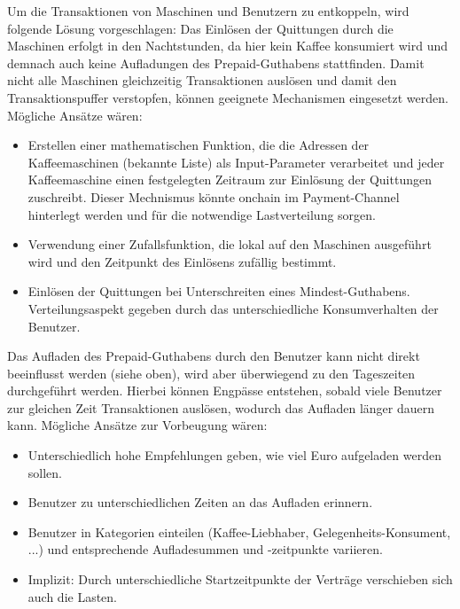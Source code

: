 Um die Transaktionen von Maschinen und Benutzern zu entkoppeln, wird folgende Lösung vorgeschlagen: Das Einlösen der Quittungen durch die Maschinen erfolgt in den Nachtstunden, da hier kein Kaffee konsumiert wird und demnach auch keine Aufladungen des Prepaid-Guthabens stattfinden. Damit nicht alle Maschinen gleichzeitig Transaktionen auslösen und damit den Transaktionspuffer verstopfen, können geeignete Mechanismen eingesetzt werden. Mögliche Ansätze wären:
\begin{itemize}
  \item Erstellen einer mathematischen Funktion, die die Adressen der Kaffeemaschinen (bekannte Liste) als Input-Parameter verarbeitet und jeder Kaffeemaschine einen festgelegten Zeitraum zur Einlösung der Quittungen zuschreibt. Dieser Mechnismus könnte onchain im Payment-Channel hinterlegt werden und für die notwendige Lastverteilung sorgen.
  \item Verwendung einer Zufallsfunktion, die lokal auf den Maschinen ausgeführt wird und den Zeitpunkt des Einlösens zufällig bestimmt.
  \item Einlösen der Quittungen bei Unterschreiten eines Mindest-Guthabens. Verteilungsaspekt gegeben durch das unterschiedliche Konsumverhalten der Benutzer.
\end{itemize}

Das Aufladen des Prepaid-Guthabens durch den Benutzer kann nicht direkt beeinflusst werden (siehe oben), wird aber überwiegend zu den Tageszeiten durchgeführt werden. Hierbei können Engpässe entstehen, sobald viele Benutzer zur gleichen Zeit Transaktionen auslösen, wodurch das Aufladen länger dauern kann. Mögliche Ansätze zur Vorbeugung wären:
\begin{itemize}
  \item Unterschiedlich hohe Empfehlungen geben, wie viel Euro aufgeladen werden sollen.
  \item Benutzer zu unterschiedlichen Zeiten an das Aufladen erinnern.
  \item Benutzer in Kategorien einteilen (Kaffee-Liebhaber, Gelegenheits-Konsument, ...) und entsprechende Aufladesummen und -zeitpunkte variieren.
  \item Implizit: Durch unterschiedliche Startzeitpunkte der Verträge verschieben sich auch die Lasten.
\end{itemize}



